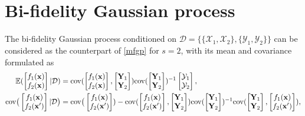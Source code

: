 \documentclass[11pt]{article}
\begin{document}
\section{Bi-fidelity Gaussian process}
The bi-fidelity Gaussian process conditioned on $\mathcal{D}=\{\{\mathcal{X}_1, \mathcal{X}_2\}, \{\mathcal{Y}_1, \mathcal{Y}_2\}\}$ can be considered as the counterpart of \eqref{mfgp} for $s=2$, with its mean and covariance formulated as 
\begin{align}
    \mathbb{E}(
    \begin{bmatrix} f_1(\mathbf{x}) \\ f_2(\mathbf{x}) \end{bmatrix}
   |\mathcal{D})  & = \rm{cov}(\begin{bmatrix} f_1(\mathbf{x}) \\ f_2(\mathbf{x}) \end{bmatrix}, \begin{bmatrix} \mathbf{Y}_1 \\ \mathbf{Y}_2 \end{bmatrix}) 
   {\rm{cov}}(\begin{bmatrix} \mathbf{Y}_1 \\ \mathbf{Y}_2 \end{bmatrix})^{-1} \begin{bmatrix} \mathcal{Y}_1 \\ \mathcal{Y}_2 \end{bmatrix},
\\  
    {\rm{cov}}\big(\begin{bmatrix} f_1(\mathbf{x}) \\ f_2(\mathbf{x}') \end{bmatrix} |\mathcal{D} \big) & = {\rm{cov}}\big(\begin{bmatrix} f_1(\mathbf{x}) \\ f_2(\mathbf{x}') \end{bmatrix}) - \rm{cov}( \begin{bmatrix} f_1(\mathbf{x}) \\ f_2(\mathbf{x}') \end{bmatrix}, \begin{bmatrix} \mathbf{Y}_1 \\ \mathbf{Y}_2 \end{bmatrix}) {\rm{cov}}(\begin{bmatrix} \mathbf{Y}_1 \\ \mathbf{Y}_2 \end{bmatrix})^{-1} \rm{cov}(\begin{bmatrix} \mathbf{Y}_1 \\ \mathbf{Y}_2 \end{bmatrix}, \begin{bmatrix} f_1(\mathbf{x}) \\ f_2(\mathbf{x}') \end{bmatrix}),
\end{align}
\end{document}
